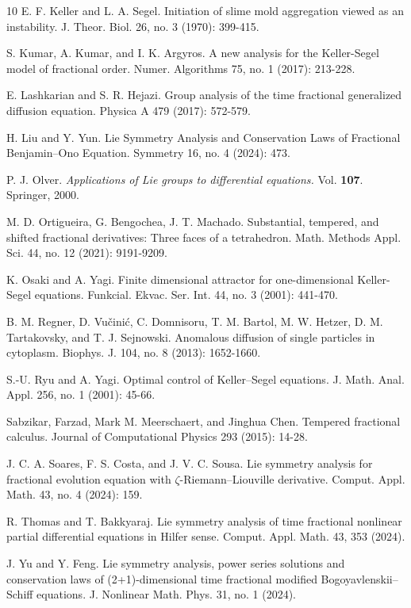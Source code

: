 \documentclass{article}
\begin{document}
\begin{thebibliography}{10}
E. F. Keller and L. A. Segel. Initiation of slime mold aggregation viewed as an instability. J. Theor. Biol. 26, no. 3 (1970): 399-415.

S. Kumar, A. Kumar, and I. K. Argyros. A new analysis for the Keller-Segel model of fractional order. Numer. Algorithms 75, no. 1 (2017): 213-228.

E. Lashkarian and S. R. Hejazi. { Group analysis of the time fractional generalized diffusion equation.} Physica A 479 (2017): 572-579.

H. Liu and Y. Yun. Lie Symmetry Analysis and Conservation Laws of Fractional Benjamin--Ono Equation. Symmetry 16, no. 4 (2024): 473.

P. J. Olver. {\em Applications of Lie groups to differential equations.} Vol. {\bf 107}. Springer, 2000.

M. D.  Ortigueira, G. Bengochea, J. T. Machado. Substantial, tempered, and shifted fractional derivatives: Three faces of a tetrahedron. Math. Methods Appl. Sci. 44, no. 12 (2021): 9191-9209.

K. Osaki and A. Yagi. Finite dimensional attractor for one-dimensional Keller-Segel equations. Funkcial. Ekvac. Ser. Int. 44, no. 3 (2001): 441-470.

B. M. Regner, D. Vučinić, C. Domnisoru, T. M. Bartol, M. W. Hetzer, D. M. Tartakovsky, and T. J. Sejnowski. Anomalous diffusion of single particles in cytoplasm. Biophys. J. 104, no. 8 (2013): 1652-1660.

S.-U. Ryu and A. Yagi. Optimal control of Keller--Segel equations. J. Math. Anal. Appl. 256, no. 1 (2001): 45-66.

Sabzikar, Farzad, Mark M. Meerschaert, and Jinghua Chen. Tempered fractional calculus. Journal of Computational Physics 293 (2015): 14-28.

J. C. A. Soares, F. S. Costa, and J. V. C. Sousa. Lie symmetry analysis for fractional evolution equation with $\zeta$-Riemann--Liouville derivative. Comput. Appl. Math. 43, no. 4 (2024): 159.

R. Thomas and T. Bakkyaraj. Lie symmetry analysis of time fractional nonlinear partial differential equations in Hilfer sense. Comput. Appl. Math. 43, 353 (2024).

J. Yu and Y. Feng. Lie symmetry analysis, power series solutions and conservation laws of (2+1)-dimensional time fractional modified Bogoyavlenskii--Schiff equations. J. Nonlinear Math. Phys. 31, no. 1 (2024).


\end{thebibliography}
\end{document}
